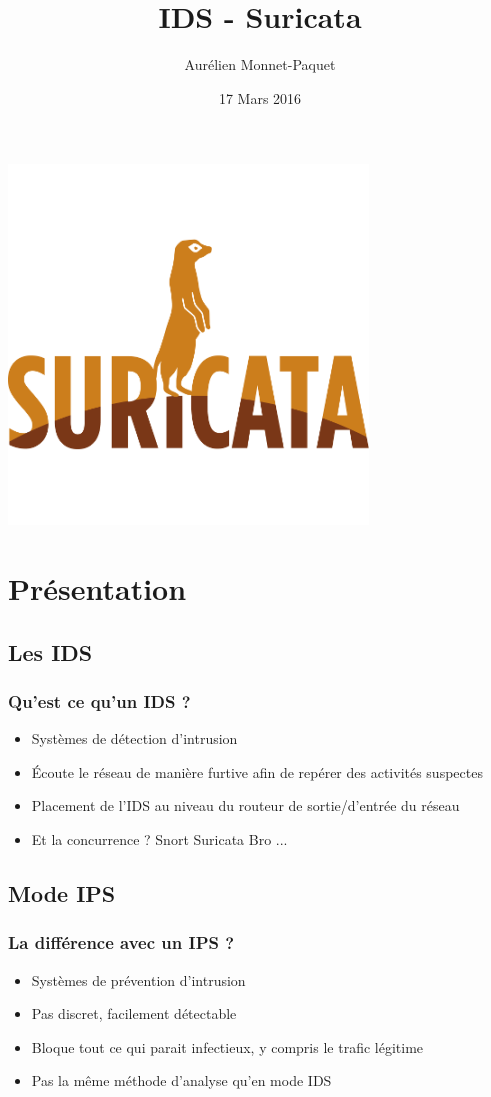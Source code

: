 \documentclass{beamer}
\title{IDS - Suricata}
\author{Aurélien Monnet-Paquet}
\institute{www.inria.fr}
\date{17 Mars 2016}
\begin{document}
\begin{frame}
\titlepage
\begin{center}
\includegraphics[scale=3]{img/suri.png}
\end{center}
\end{frame}

\section{Présentation}
\subsection{Les IDS}
\begin{frame}
\frametitle{Qu'est ce qu'un IDS ?}
\begin{itemize}
[triangle]
\item Systèmes de détection d'intrusion
\item Écoute le réseau de manière furtive afin de repérer des activités suspectes
\pause
\item Placement de l'IDS au niveau du routeur de sortie/d'entrée du réseau
\pause
\item Et la concurrence ? Snort Suricata Bro ...
\end{itemize}
\end{frame}

\subsection{Mode IPS}
\begin{frame}
\frametitle{La différence avec un IPS ?}
\begin{itemize}
[triangle]
\item Systèmes de prévention d'intrusion
\item Pas discret, facilement détectable
\pause
\item Bloque tout ce qui parait infectieux, y compris le trafic légitime
\pause
\item Pas la même méthode d'analyse qu'en mode IDS
\end{itemize}
\end{frame}
\end{document}
